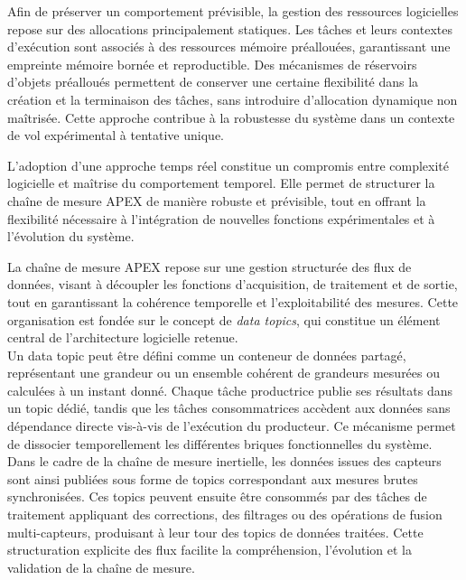 Afin de préserver un comportement prévisible, la gestion des ressources logicielles repose sur des
allocations principalement statiques. Les tâches et leurs contextes d’exécution sont associés à des
ressources mémoire préallouées, garantissant une empreinte mémoire bornée et reproductible. Des
mécanismes de réservoirs d’objets préalloués permettent de conserver une certaine flexibilité dans la
création et la terminaison des tâches, sans introduire d’allocation dynamique non maîtrisée. Cette
approche contribue à la robustesse du système dans un contexte de vol expérimental à tentative unique.

L’adoption d’une approche temps réel constitue un compromis entre complexité logicielle et maîtrise du
comportement temporel. Elle permet de structurer la chaîne de mesure APEX de manière robuste et
prévisible, tout en offrant la flexibilité nécessaire à l’intégration de nouvelles fonctions expérimentales
et à l’évolution du système.



La chaîne de mesure APEX repose sur une gestion structurée des flux de données, visant à découpler les
fonctions d’acquisition, de traitement et de sortie, tout en garantissant la cohérence temporelle et
l’exploitabilité des mesures. Cette organisation est fondée sur le concept de \emph{data topics}, qui
constitue un élément central de l’architecture logicielle retenue.\\

Un data topic peut être défini comme un conteneur de données partagé, représentant une grandeur ou un
ensemble cohérent de grandeurs mesurées ou calculées à un instant donné. Chaque tâche productrice
publie ses résultats dans un topic dédié, tandis que les tâches consommatrices accèdent aux données sans
dépendance directe vis-à-vis de l’exécution du producteur. Ce mécanisme permet de dissocier
temporellement les différentes briques fonctionnelles du système.\\

Dans le cadre de la chaîne de mesure inertielle, les données issues des capteurs sont ainsi publiées sous
forme de topics correspondant aux mesures brutes synchronisées. Ces topics peuvent ensuite être
consommés par des tâches de traitement appliquant des corrections, des filtrages ou des opérations de
fusion multi-capteurs, produisant à leur tour des topics de données traitées. Cette structuration explicite
des flux facilite la compréhension, l’évolution et la validation de la chaîne de mesure.\\

